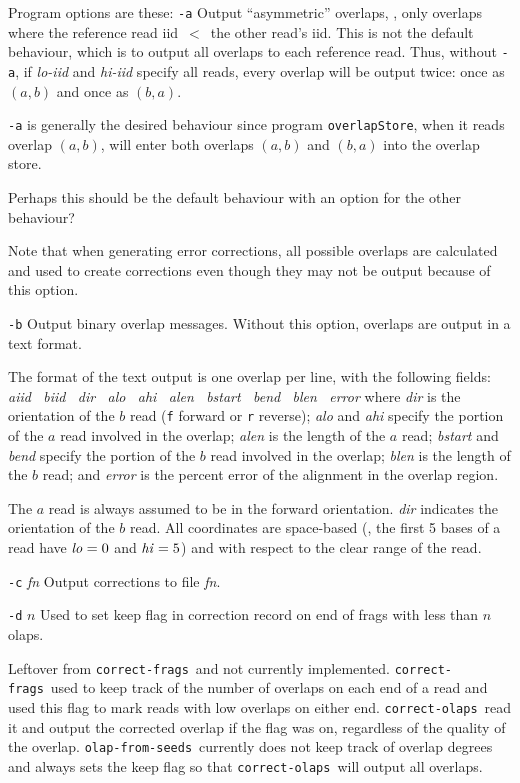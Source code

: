 \documentclass[letterpaper,11pt]{article}
\def\Pgm#1{\texttt{#1}}
\def\correctfrags{\Pgm{correct-frags}}
\def\correctolaps{\Pgm{correct-olaps}}
\def\ofs{\Pgm{olap-from-seeds}}
\newenvironment{technotes}{\bq\small\bf\bi\exdent{Technical Notes:}}{\ei\eq}
\def\btn{\begin{technotes}}
\def\etn{\end{technotes}}
\begin{document}
Program options are these:
\bi
\exdent
  \Pgm{-a} \quad
  Output ``asymmetric'' overlaps, \ie, only overlaps where the reference
  read iid~$<$~the other read's iid.  This is not the default behaviour,
  which is to output all overlaps to each reference read.  Thus, without
  \Pgm{-a}, if \emph{lo-iid} and \emph{hi-iid} specify all reads, every
  overlap will be output twice:  once as $(a,b)$ and once as $(b,a)$.
  \btn
  \item
    \Pgm{-a} is generally the desired behaviour since program \Pgm{overlapStore},
    when it reads overlap $(a,b)$, will enter both overlaps $(a,b)$ and
    $(b,a)$ into the overlap store.
  \item
    Perhaps this should be the default behaviour with an option for the
    other behaviour?
  \item
    Note that when generating error corrections, all possible overlaps are
    calculated and used to create corrections even though they may not
    be output because of this option.
  \etn

\exdent
  \Pgm{-b} \quad
   Output binary overlap messages.  Without this option, overlaps are
   output in a text format.
   \btn
   \item
     The format of the text output is one overlap per line, with the following
     fields:
     \emph{aiid \, biid \, dir \, alo \, ahi \, alen \, bstart \, bend \, blen \, error}
     where \emph{dir} is the orientation of the $b$ read (\Pgm{f} forward or
     \Pgm{r} reverse); \emph{alo} and \emph{ahi} specify the portion of the
     $a$ read involved in the overlap; \emph{alen} is the length of the $a$
     read; \emph{bstart} and \emph{bend} specify the portion of the
     $b$ read involved in the overlap; \emph{blen} is the length of the $b$
     read; and \emph{error} is the percent error of the alignment in the overlap
     region.

     The $a$ read is always assumed to be in the forward orientation.  \emph{dir}
     indicates the orientation of the $b$ read.  All coordinates are space-based
     (\eg, the first 5 bases of a read have $\mbox{\emph{lo}} = 0$ and
     $\mbox{\emph{hi}} = 5$) and with respect to the clear range of the read.
   \etn

\exdent
  \Pgm{-c} \emph{fn} \quad
  Output corrections to file \emph{fn}.

\exdent
  \Pgm{-d} $n$ \quad
  Used to set keep flag in correction record on end of frags with less
  than $n$ olaps.
  \btn
  \item
    Leftover from \correctfrags\ and
    not currently implemented.  \correctfrags\ used to keep track of the
    number of overlaps on each end of a read and used this flag to mark
    reads with low overlaps on either end.  \correctolaps\ read it and
    output the corrected overlap if the flag was on, regardless of the
    quality of the overlap.  \ofs\ currently does not keep track of
    overlap degrees and always sets the keep flag
    so that \correctolaps\ will output all overlaps.
  \etn
\end{document}
